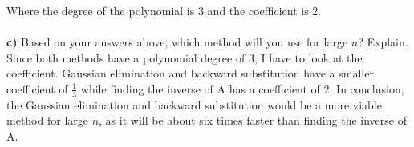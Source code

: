 \documentclass{article}
\begin{document}
Where the degree of the polynomial is $3$ and the coefficient is $2$.\\\\

{\bf c)} Based on your answers above, which method will you use for large $n$?
Explain. \\

Since both methods have a polynomial degree of 3, I have to look at the coefficient. Gaussian elimination and backward substitution have a smaller coefficient of $\frac {1}{3}$ while finding the inverse of A has a coefficient of $2$. In conclusion, the Gaussian elimination and backward substitution would be a more viable method for large $n$, as it will be about six times faster than finding the inverse of A.
\end{document}
